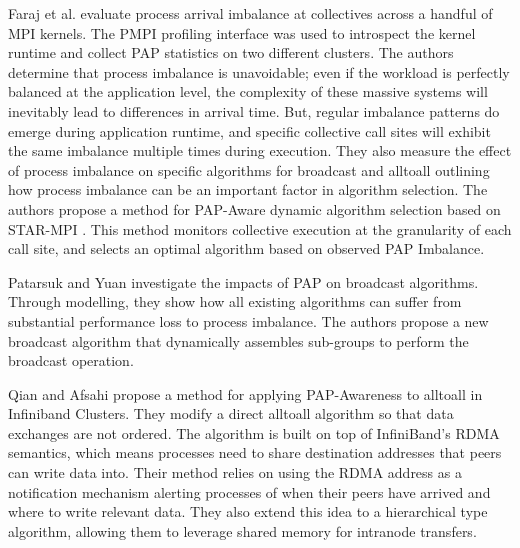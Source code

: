 Faraj et al. \cite{Faraj2008StudyProcArrivalMPIColl} evaluate process arrival imbalance at collectives across a handful of MPI kernels.
The PMPI profiling interface was used to introspect the kernel runtime and collect PAP statistics on two different clusters.
The authors determine that process imbalance is unavoidable; even if the workload is perfectly balanced at the application level, the complexity of these massive systems will inevitably lead to differences in arrival time. 
But, regular imbalance patterns do emerge during application runtime, and specific collective call sites will exhibit the same imbalance multiple times during execution.
They also measure the effect of process imbalance on specific algorithms for broadcast and alltoall outlining how process imbalance can be an important factor in algorithm selection.
The authors propose a method for PAP-Aware dynamic algorithm selection based on STAR-MPI \cite{Faraj2006StarMPI}.
This method monitors collective execution at the granularity of each call site, and selects an optimal algorithm based on observed PAP Imbalance. 

Patarsuk and Yuan \cite{Patarasuk2008EffBcastDifProcArr} investigate the impacts of PAP on broadcast algorithms.
Through modelling, they show how all existing algorithms can suffer from substantial performance loss to process imbalance. 
The authors propose a new broadcast algorithm that dynamically assembles sub-groups to perform the broadcast operation.

Qian and Afsahi \cite{Qian2009ProcArrivalSHMA2AIB} propose a method for applying PAP-Awareness to alltoall in Infiniband Clusters.
They modify a direct alltoall algorithm so that data exchanges are not ordered.
The algorithm is built on top of InfiniBand's RDMA semantics, which means processes need to share destination addresses that peers can write data into. 
Their method relies on using the RDMA address as a notification mechanism alerting processes of when their peers have arrived and where to write relevant data.
They also extend this idea to a hierarchical type algorithm, allowing them to leverage shared memory for intranode transfers.

